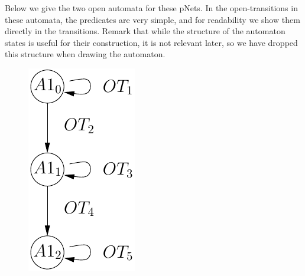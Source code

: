 \documentclass{lncs/llncs}
\begin{document}
  Below we give the two open automata for these pNets. In the
  open-transitions in these 
    automata, the predicates are very simple, and for readability
    we show them directly in the transitions.
    Remark that while the structure of the automaton states is useful
    for their construction, it is not relevant later, so we have
    dropped this structure when drawing the automaton.

\begin{figure}[h]
  \begin{minipage}{2cm}
  \includegraphics[width=\linewidth]{XFIG/PQR-automaton}

\end{minipage}
\end{figure}
\end{document}
